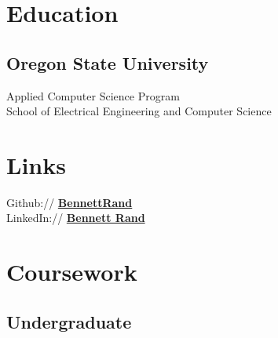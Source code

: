 \documentclass[letterpaper]{deedy-resume} %
\begin{document}
\begin{minipage}[t]{0.33\textwidth} %


\section{Education} 

\subsection{Oregon State University}

Applied Computer Science Program \\
School of Electrical Engineering and Computer Science \\


\sectionspace %


\section{Links} 

Github:// \href{https://github.com/BennettRand}{\bf BennettRand} \\
LinkedIn:// \href{https://www.linkedin.com/pub/bennett-rand/51/76a/679}{\bf Bennett Rand} \\

\sectionspace %


\section{Coursework}

\subsection{Undergraduate}
\vspace{\topsep} %


\end{minipage}
\end{document}
